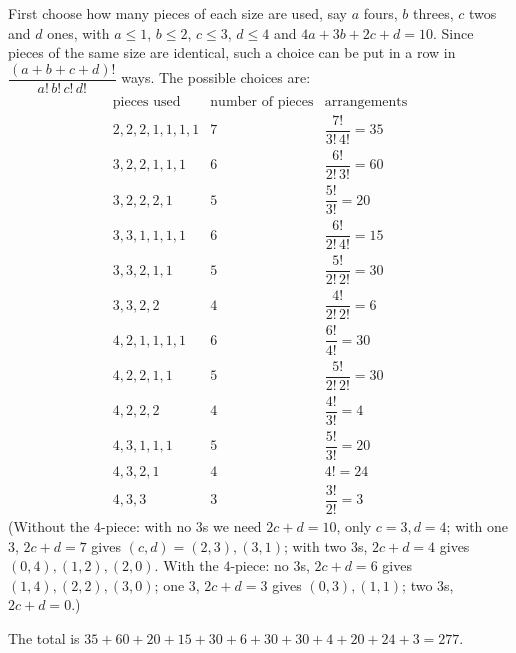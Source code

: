 First choose how many pieces of each size are used, say $a$ fours, $b$ threes, $c$ twos and $d$ ones, with $a\le1$, $b\le2$, $c\le3$, $d\le4$ and $4a+3b+2c+d=10$. Since pieces of the same size are identical, such a choice can be put in a row in $\dfrac{(a+b+c+d)!}{a!\,b!\,c!\,d!}$ ways. The possible choices are:
\[
\begin{array}{c|c|c}
\text{pieces used} & \text{number of pieces} & \text{arrangements}\\ \hline
2,2,2,1,1,1,1 & 7 & \dfrac{7!}{3!\,4!}=35\\
3,2,2,1,1,1 & 6 & \dfrac{6!}{2!\,3!}=60\\
3,2,2,2,1 & 5 & \dfrac{5!}{3!}=20\\
3,3,1,1,1,1 & 6 & \dfrac{6!}{2!\,4!}=15\\
3,3,2,1,1 & 5 & \dfrac{5!}{2!\,2!}=30\\
3,3,2,2 & 4 & \dfrac{4!}{2!\,2!}=6\\
4,2,1,1,1,1 & 6 & \dfrac{6!}{4!}=30\\
4,2,2,1,1 & 5 & \dfrac{5!}{2!\,2!}=30\\
4,2,2,2 & 4 & \dfrac{4!}{3!}=4\\
4,3,1,1,1 & 5 & \dfrac{5!}{3!}=20\\
4,3,2,1 & 4 & 4!=24\\
4,3,3 & 3 & \dfrac{3!}{2!}=3
\end{array}
\]
(Without the $4$-piece: with no $3$s we need $2c+d=10$, only $c=3,d=4$; with one $3$, $2c+d=7$ gives $(c,d)=(2,3),(3,1)$; with two $3$s, $2c+d=4$ gives $(0,4),(1,2),(2,0)$. With the $4$-piece: no $3$s, $2c+d=6$ gives $(1,4),(2,2),(3,0)$; one $3$, $2c+d=3$ gives $(0,3),(1,1)$; two $3$s, $2c+d=0$.)

The total is $35+60+20+15+30+6+30+30+4+20+24+3=\boxed{277}$.
